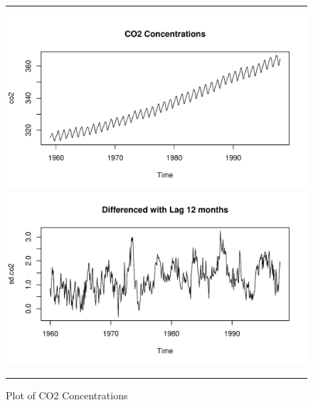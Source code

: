 \documentclass[11pt, letterpaper, twoside]{memoir}\usepackage{knitr}
\begin{document}
\begin{figure}
\centering
\rule{4in}{1pt}
\begin{knitrout}
\color{fgcolor}\begin{kframe}
\begin{alltt}
\hlstd{(}\hlstd{);}  \hlstd{=}\hlstd{)}
\end{alltt}
\end{kframe}
\includegraphics[width=\maxwidth]{figure/unnamed-chunk-107-1} 
\begin{kframe}\begin{alltt}
 \hlkwb{<-}   \hlstd{=} \hlstd{)}
 \hlstd{=}\hlstd{)}
\end{alltt}
\end{kframe}
\includegraphics[width=\maxwidth]{figure/unnamed-chunk-107-2} 

\end{knitrout}
\caption{Plot of CO2 Concentrations}
\label{Fig:CO2}
\rule{4in}{1pt}
\end{figure}
\end{document}
